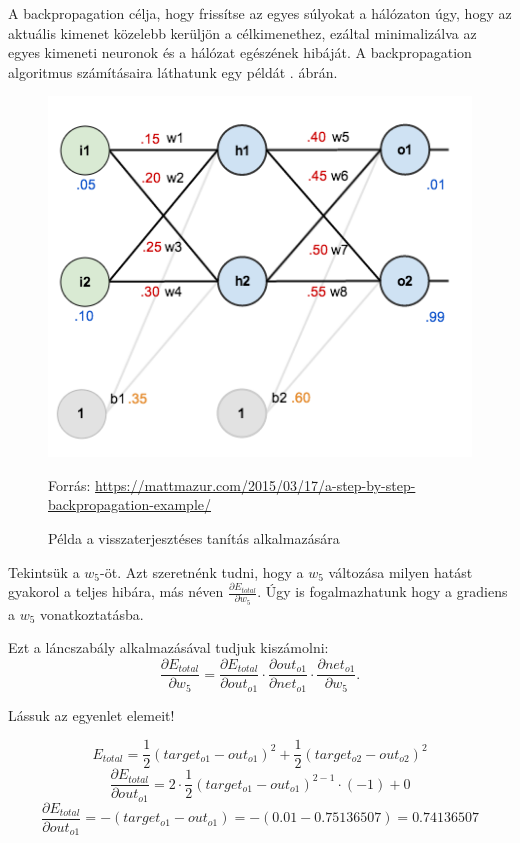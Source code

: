 A backpropagation célja, hogy frissítse az egyes súlyokat a hálózaton úgy, hogy az aktuális kimenet közelebb kerüljön a célkimenethez, ezáltal minimalizálva az egyes kimeneti neuronok és a hálózat egészének hibáját. A backpropagation algoritmus számításaira láthatunk egy példát . ábrán.

\begin{figure}[h]
\centering
\includegraphics[scale=0.5]{images/ANN_backprog}
\caption{Példa a visszaterjesztéses tanítás alkalmazására}
Forrás: \url{https://mattmazur.com/2015/03/17/a-step-by-step-backpropagation-example/}
\label{fig:ANN_backprog}
\end{figure}

Tekintsük a $w_5$-öt. Azt szeretnénk tudni, hogy a $w_5$ változása milyen hatást gyakorol a teljes hibára, más néven $\frac{\partial E_ {total}}{\partial w_ {5}}$. Úgy is fogalmazhatunk hogy a gradiens a $w_5$ vonatkoztatásba.

Ezt a láncszabály alkalmazásával tudjuk kiszámolni:
$$
\frac{\partial E_{total}}{\partial w_{5}} = \frac{\partial E_{total}}{\partial out_{o1}} \cdot \frac{\partial out_{o1}}{\partial net_{o1}} \cdot \frac{\partial net_{o1}}{\partial w_{5}}.
$$

Lássuk az egyenlet elemeit!
\begin{flushleft}
\begin{equation}
E_{total} = \frac{1}{2}(target_{o1} - out_{o1})^{2} + \frac{1}{2}(target_{o2} - out_{o2})^{2}
\end{equation}
\begin{equation}
\frac{\partial E_{total}}{\partial out_{o1}} = 2 \cdot \frac{1}{2}(target_{o1} - out_{o1})^{2 - 1} \cdot (-1) + 0
\end{equation}
\begin{equation}
\frac{\partial E_{total}}{\partial out_{o1}} = -(target_{o1} - out_{o1}) = -(0.01 - 0.75136507) = 0.74136507
\end{equation}

\end{flushleft}

